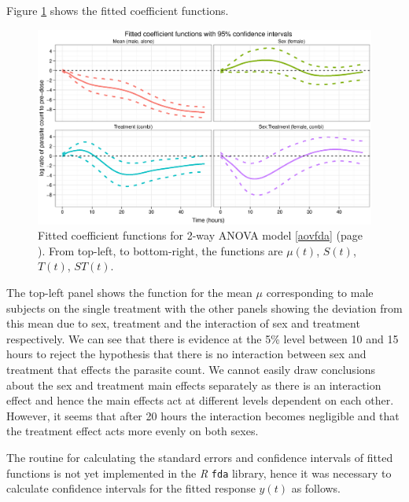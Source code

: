Figure \ref{fdcoef} shows the fitted coefficient functions.
\begin{figure}[p]
\includegraphics[width=150mm]{fdcoef.eps} 
\caption{Fitted coefficient functions for 2-way ANOVA model \ref{aovfda} (page \pageref{aovfda}). From top-left, to bottom-right, the functions are $\mu(t)$, $S(t)$, $T(t)$, $ST(t)$.}
\label{fdcoef}
\end{figure}
The top-left panel shows the function for the mean $\mu$ corresponding to male subjects on the single treatment with the other panels showing the deviation from this mean due to sex, treatment and the interaction of sex and treatment respectively. We can see that there is evidence at the 5\% level between 10 and 15 hours to reject the hypothesis that there is no interaction between sex and treatment that effects the parasite count. We cannot easily draw conclusions about the sex and treatment main effects separately as there is an interaction effect and hence the main effects act at different levels dependent on each other. However, it seems that after 20 hours the interaction becomes negligible and that the treatment effect acts more evenly on both sexes.

\newpage
The routine for calculating the standard errors and confidence intervals of fitted functions is not yet implemented in the \emph{R} \texttt{fda} library, hence it was necessary to calculate confidence intervals for the fitted response $\hat{y}(t)$ as follows.

